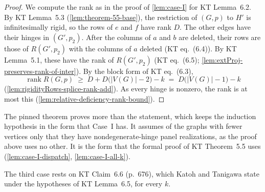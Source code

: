 \begin{proof}
  We compute the rank as in the proof of \cref{lem:case-I} for KT
  Lemma~6.2. By KT Lemma~5.3 (\cref{lem:theorem-55-base}), the restriction of
  $(G,p)$ to $H'$ is infinitesimally rigid, so the rows of $e$ and $f$
  have rank $D$. The other edges have their hinges in $(G', p_2)$. After
  the columns of $a$ and $b$ are deleted, their rows are those of
  $R(G', p_2)$ with the columns of $a$ deleted (KT eq.~(6.4)). By KT
  Lemma~5.1, these have the rank of $R(G', p_2)$ (KT eq.~(6.5);
  \cref{lem:extProj-preserves-rank-of-inter}). By the block form of KT
  eq.~(6.3),
  \[
    \operatorname{rank} R(G,p) \;\ge\; D + D\bigl(|V(G)| - 2\bigr) - k
    \;=\; D\bigl(|V(G)| - 1\bigr) - k
  \]
  (\cref{lem:rigidityRows-splice-rank-add}). As every hinge is nonzero,
  the rank is at most this (\cref{lem:relative-deficiency-rank-bound}).
\end{proof}

\begin{fmlnote}
  The pinned theorem proves more than the statement, which keeps the
  induction hypothesis in the form that Case~I has. It assumes of the
  graphs with fewer vertices only that they have nondegenerate-hinge
  panel realizations, as the proof above uses no other. It is the form
  that the formal proof of KT Theorem~5.5 uses
  (\cref{lem:case-I-dispatch}, \cref{lem:case-I-all-k}).
\end{fmlnote}

The third case rests on KT Claim~6.6 (p.~676), which Katoh and Tanigawa
state under the hypotheses of KT Lemma~6.5, for every $k$.

